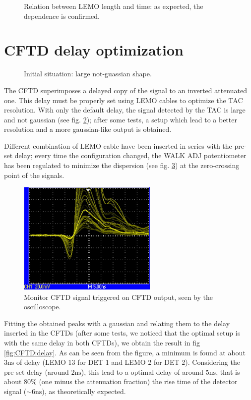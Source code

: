 \documentclass[11pt,a4 paper]{article}
\begin{document}
\begin{figure}[H]
    \centering
    \caption{Relation between LEMO length and time: as expected, the dependence is confirmed.}
    \label{fig:lemo_length}
\end{figure}

\section{CFTD delay optimization}

\begin{figure}[H]
    \centering
    \caption{Initial situation: large not-guassian shape.}
    \label{fig:delay:bad}
\end{figure}

The CFTD superimposes a delayed copy of the signal to an inverted attenuated one. This delay must be properly set using LEMO cables to optimize the TAC resolution. With only the default delay, the signal detected by the TAC is large and not gaussian (see fig. \ref{fig:delay:bad}); after some tests, a setup which lead to a better resolution and a more gaussian-like output is obtained.

Different combination of LEMO cable have been inserted in series with the pre-set delay; every time the configuration changed, the WALK ADJ potentiometer has been regulated to minimize the dispersion (see fig. \ref{fig:oscilloscope}) at the zero-crossing point of the signals.
\begin{figure}[H]
    \centering
    \includegraphics[width=0.6\textwidth]{img/oscilloscope.jpg}
    \caption{Monitor CFTD signal triggered on CFTD output, seen by the oscilloscope.}
    \label{fig:oscilloscope}
\end{figure}

Fitting the obtained peaks with a gaussian and relating them to the delay inserted in the CFTDs (after some tests, we noticed that the optimal setup is with the same delay in both CFTDs), we obtain the result in fig \ref{fig:CFTD:delay}. As can be seen from the figure, a minimum is found at about $3\si{\nano\second}$ of delay (LEMO 13 for DET 1 and LEMO 2 for DET 2). Considering the pre-set delay (around $2\si{\nano\second}$), this lead to a optimal delay of around $5\si{\nano\second}$, that is about $80\%$ (one minus the attenuation fraction) the rise time of the detector signal ($\sim6\si{\nano\second}$), as  theoretically expected.
\end{document}
